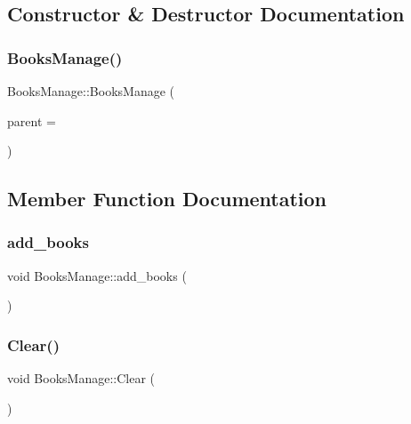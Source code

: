 \subsection{Constructor \& Destructor Documentation}
\mbox{\label{class_books_manage_adc44f2312ab4d2cd48868ff923fa8861}} 
\subsubsection{\texorpdfstring{BooksManage()}{BooksManage()}}
{\footnotesize\ttfamily Books\+Manage\+::\+Books\+Manage (\begin{DoxyParamCaption}\item[{Q\+Widget $\ast$}]{parent = {} }\end{DoxyParamCaption})\hspace{0.3cm}{\ttfamily [explicit]}}



\subsection{Member Function Documentation}
\mbox{\label{class_books_manage_a39c7bdd07e0af93379e1270becd8525c}} 
\subsubsection{\texorpdfstring{add\_books}{add\_books}}
{\footnotesize\ttfamily void Books\+Manage\+::add\+\_\+books (\begin{DoxyParamCaption}{ }\end{DoxyParamCaption})\hspace{0.3cm}{\ttfamily [slot]}}

\mbox{\label{class_books_manage_a8388b6b8547cc759a9976c1a567aab0a}} 
\subsubsection{\texorpdfstring{Clear()}{Clear()}}
{\footnotesize\ttfamily void Books\+Manage\+::\+Clear (\begin{DoxyParamCaption}{ }\end{DoxyParamCaption})}

